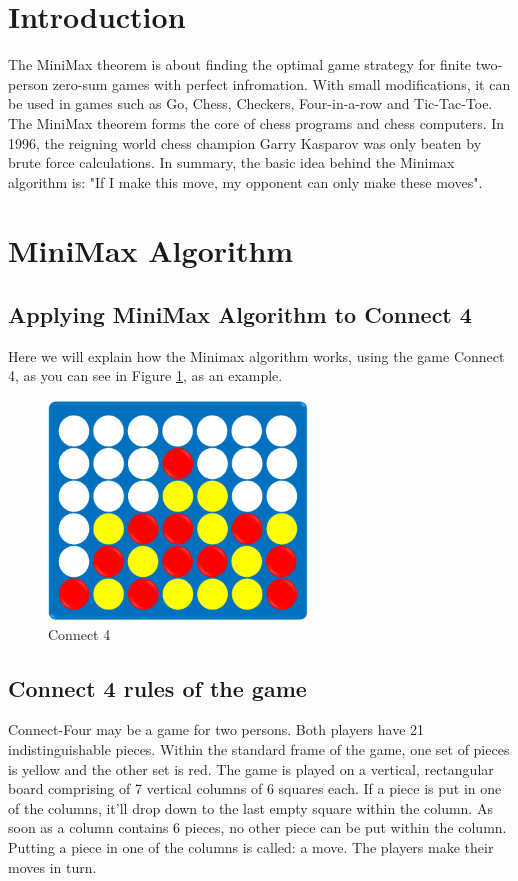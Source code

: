 \documentclass[conference,pdf,table,xcdraw, utf8]{IEEEtran}
\begin{document}
\section{Introduction}
The MiniMax theorem is about finding the optimal game strategy for finite two-person zero-sum games with perfect infromation. With small modifications, it can be used in games such as Go, Chess, Checkers, Four-in-a-row and Tic-Tac-Toe. The MiniMax theorem forms the core of chess programs and chess computers. In 1996, the reigning world chess champion Garry Kasparov was only beaten by brute force calculations. In summary, the basic idea behind the Minimax algorithm is: "If I make this move, my opponent can only make these moves".~\cite{introduction}


\section{MiniMax Algorithm}
\subsection{Applying MiniMax Algorithm to Connect 4}
Here we will explain how the Minimax algorithm works, using the game Connect 4, as you can see in Figure \ref{figure:connect4}, as an example.

\begin{figure}[H]
    \centering
    \includegraphics[scale=0.65]{images/connect4.png}
    \caption{Connect 4}
    \label{figure:connect4}
\end{figure}

\subsection{Connect 4 rules of the game}
Connect-Four may be a game for two persons. Both players have 21 indistinguishable pieces. Within the standard frame of the game, one set of pieces is yellow and the other set is red. The game is played on a vertical, rectangular board comprising of 7 vertical columns of 6 squares each. If a piece is put in one of the columns, it'll drop down to the last empty square within the column. As soon as a column contains 6 pieces, no other piece can be put within the column. Putting a piece in one of the columns is called: a move. The players make their moves in turn.~\cite{4connect_rules2}
\end{document}
